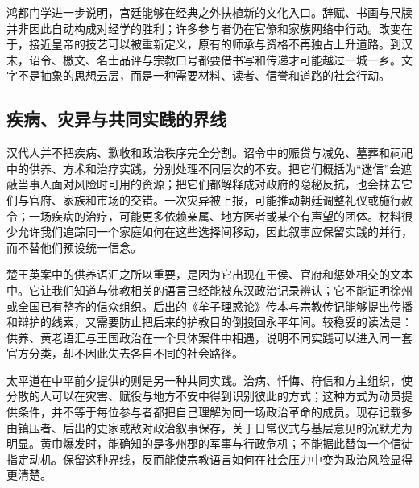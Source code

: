 鸿都门学进一步说明，宫廷能够在经典之外扶植新的文化入口。辞赋、书画与尺牍并非因此自动构成对经学的胜利；许多参与者仍在官僚和家族网络中行动。改变在于，接近皇帝的技艺可以被重新定义，原有的师承与资格不再独占上升道路。到汉末，诏令、檄文、名士品评与宗教口号都要借书写和传递才可能越过一城一乡。文字不是抽象的思想云层，而是一种需要材料、读者、信誉和道路的社会行动。

\subsection{疾病、灾异与共同实践的界线}

汉代人并不把疾病、歉收和政治秩序完全分割。诏令中的赈贷与减免、墓葬和祠祀中的供养、方术和治疗实践，分别处理不同层次的不安。把它们概括为“迷信”会遮蔽当事人面对风险时可用的资源；把它们都解释成对政府的隐秘反抗，也会抹去它们与官府、家族和市场的交错。一次灾异被上报，可能推动朝廷调整礼仪或施行赦令；一场疾病的治疗，可能更多依赖亲属、地方医者或某个有声望的团体。材料很少允许我们追踪同一个家庭如何在这些选择间移动，因此叙事应保留实践的并行，而不替他们预设统一信念。

楚王英案中的供养语汇之所以重要，是因为它出现在王侯、官府和惩处相交的文本中。它让我们知道与佛教相关的语言已经能被东汉政治记录辨认；它不能证明徐州或全国已有整齐的信众组织。后出的《牟子理惑论》传本与宗教传记能够提出传播和辩护的线索，又需要防止把后来的护教目的倒投回永平年间。较稳妥的读法是：供养、黄老语汇与王国政治在一个具体案件中相遇，说明不同实践可以进入同一套官方分类，却不因此失去各自不同的社会路径。

太平道在中平前夕提供的则是另一种共同实践。治病、忏悔、符信和方主组织，使分散的人可以在灾害、赋役与地方不安中得到识别彼此的方式；这种方式为动员提供条件，并不等于每位参与者都把自己理解为同一场政治革命的成员。现存记载多由镇压者、后出的史家或敌对政治叙事保存，关于日常仪式与基层意见的沉默尤为明显。黄巾爆发时，能确知的是多州郡的军事与行政危机；不能据此替每一个信徒指定动机。保留这种界线，反而能使宗教语言如何在社会压力中变为政治风险显得更清楚。

